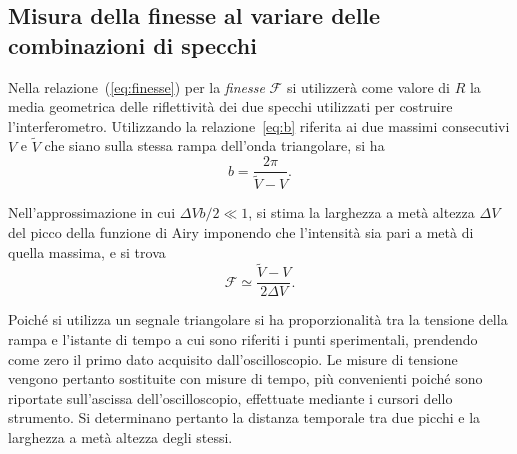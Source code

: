 \documentclass[10pt,oneside,a4paper]{article}
\begin{document}
\begin{multicols}{2}
\section{Misura della finesse al variare delle combinazioni di specchi}
Nella relazione~(\ref{eq:finesse}) per la \emph{finesse} $\mathcal{F}$ si utilizzerà come valore di $R$ la media geometrica delle riflettività dei due specchi utilizzati per costruire l'interferometro. Utilizzando la relazione~\ref{eq:b} riferita ai due massimi consecutivi $V$ e $\tilde{V}$ che siano sulla stessa rampa dell'onda triangolare, si ha
\begin{equation}\label{eq:b}
	b=\frac{2\pi}{\tilde{V}-V}.
\end{equation}

Nell'approssimazione in cui ${\Delta V b/ 2 \ll 1}$, si stima la larghezza a metà altezza $\Delta V$ del picco della funzione di Airy imponendo che l'intensità sia pari a metà di quella massima, e si trova
\begin{equation}\label{eq:F_approx}
	\mathcal{F} \simeq \frac{\tilde{V} - V}{2 \Delta V}.
\end{equation}

Poiché si utilizza un segnale triangolare si ha proporzionalità tra la tensione della rampa e l'istante di tempo a cui sono riferiti i punti sperimentali, prendendo come zero il primo dato acquisito dall'oscilloscopio. Le misure di tensione vengono pertanto sostituite con misure di tempo, più convenienti poiché sono riportate sull'ascissa dell'oscilloscopio, effettuate mediante i cursori dello strumento. Si determinano pertanto la distanza temporale tra due picchi e la larghezza a metà altezza degli stessi.
 

\end{multicols}
\end{document}
